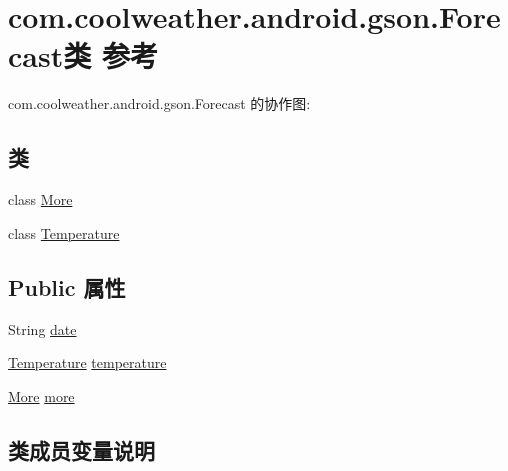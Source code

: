 \hypertarget{classcom_1_1coolweather_1_1android_1_1gson_1_1_forecast}{}\section{com.\+coolweather.\+android.\+gson.\+Forecast类 参考}
\label{classcom_1_1coolweather_1_1android_1_1gson_1_1_forecast}


com.\+coolweather.\+android.\+gson.\+Forecast 的协作图\+:
\subsection*{类}
\begin{DoxyCompactItemize}
\item 
class \mbox{\hyperlink{classcom_1_1coolweather_1_1android_1_1gson_1_1_forecast_1_1_more}{More}}
\item 
class \mbox{\hyperlink{classcom_1_1coolweather_1_1android_1_1gson_1_1_forecast_1_1_temperature}{Temperature}}
\end{DoxyCompactItemize}
\subsection*{Public 属性}
\begin{DoxyCompactItemize}
\item 
String \mbox{\hyperlink{classcom_1_1coolweather_1_1android_1_1gson_1_1_forecast_a2fef9ee84e025f7ccd7cfd230e31521e}{date}}
\item 
\mbox{\hyperlink{classcom_1_1coolweather_1_1android_1_1gson_1_1_forecast_1_1_temperature}{Temperature}} \mbox{\hyperlink{classcom_1_1coolweather_1_1android_1_1gson_1_1_forecast_aade1de76973c587e9f6ead296e434fde}{temperature}}
\item 
\mbox{\hyperlink{classcom_1_1coolweather_1_1android_1_1gson_1_1_forecast_1_1_more}{More}} \mbox{\hyperlink{classcom_1_1coolweather_1_1android_1_1gson_1_1_forecast_a94a13b10173afc0d1294186cbddcdf36}{more}}
\end{DoxyCompactItemize}


\subsection{类成员变量说明}
\mbox{\label{classcom_1_1coolweather_1_1android_1_1gson_1_1_forecast_a2fef9ee84e025f7ccd7cfd230e31521e}} 
